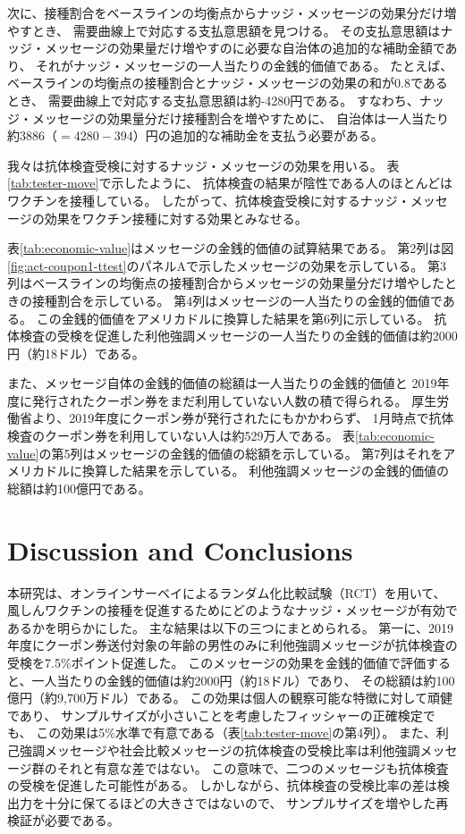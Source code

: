 \documentclass[
  11pt,
  a4paper,
]{article}
\begin{document}
次に、接種割合をベースラインの均衡点からナッジ・メッセージの効果分だけ増やすとき、
需要曲線上で対応する支払意思額を見つける。
その支払意思額はナッジ・メッセージの効果量だけ増やすのに必要な自治体の追加的な補助金額であり、
それがナッジ・メッセージの一人当たりの金銭的価値である。
たとえば、ベースラインの均衡点の接種割合とナッジ・メッセージの効果の和が0.8であるとき、
需要曲線上で対応する支払意思額は約-4280円である。
すなわち、ナッジ・メッセージの効果量分だけ接種割合を増やすために、
自治体は一人当たり約3886（\(=4280-394\)）円の追加的な補助金を支払う必要がある。

我々は抗体検査受検に対するナッジ・メッセージの効果を用いる。
表\ref{tab:tester-move}で示したように、
抗体検査の結果が陰性である人のほとんどはワクチンを接種している。
したがって、抗体検査受検に対するナッジ・メッセージの効果をワクチン接種に対する効果とみなせる。

表\ref{tab:economic-value}はメッセージの金銭的価値の試算結果である。
第2列は図\ref{fig:act-coupon1-ttest}のパネルAで示したメッセージの効果を示している。
第3列はベースラインの均衡点の接種割合からメッセージの効果量分だけ増やしたときの接種割合を示している。
第4列はメッセージの一人当たりの金銭的価値である。
この金銭的価値をアメリカドルに換算した結果を第6列に示している。
抗体検査の受検を促進した利他強調メッセージの一人当たりの金銭的価値は約2000円（約18ドル）である。

また、メッセージ自体の金銭的価値の総額は一人当たりの金銭的価値と
2019年度に発行されたクーポン券をまだ利用していない人数の積で得られる。
厚生労働省より、2019年度にクーポン券が発行されたにもかかわらず、
1月時点で抗体検査のクーポン券を利用していない人は約529万人である。
表\ref{tab:economic-value}の第5列はメッセージの金銭的価値の総額を示している。
第7列はそれをアメリカドルに換算した結果を示している。
利他強調メッセージの金銭的価値の総額は約100億円である。

\hypertarget{conclusion}{%
\section{Discussion and Conclusions}\label{conclusion}}

本研究は、オンラインサーベイによるランダム化比較試験（RCT）を用いて、
風しんワクチンの接種を促進するためにどのようなナッジ・メッセージが有効であるかを明らかにした。
主な結果は以下の三つにまとめられる。
第一に、2019年度にクーポン券送付対象の年齢の男性のみに利他強調メッセージが抗体検査の受検を7.5\%ポイント促進した。
このメッセージの効果を金銭的価値で評価すると、一人当たりの金銭的価値は約2000円（約18ドル）であり、
その総額は約100億円（約9,700万ドル）である。
この効果は個人の観察可能な特徴に対して頑健であり、
サンプルサイズが小さいことを考慮したフィッシャーの正確検定でも、
この効果は5\%水準で有意である（表\ref{tab:tester-move}の第4列）。
また、利己強調メッセージや社会比較メッセージの抗体検査の受検比率は利他強調メッセージ群のそれと有意な差ではない。
この意味で、二つのメッセージも抗体検査の受検を促進した可能性がある。
しかしながら、抗体検査の受検比率の差は検出力を十分に保てるほどの大きさではないので、
サンプルサイズを増やした再検証が必要である。
\end{document}

